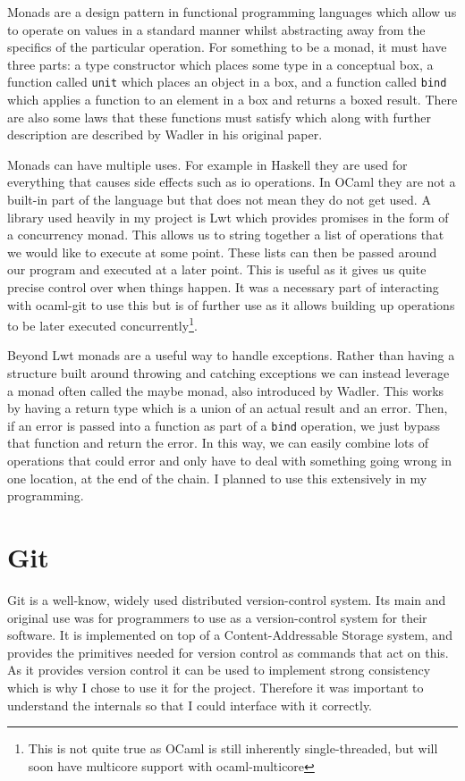 Monads are a design pattern in functional programming languages which allow us to operate on values in a standard manner whilst abstracting away from the specifics of the particular operation. For something to be a monad, it must have three parts: a type constructor which places some type in a conceptual box, a function called \texttt{unit} which places an object in a box, and a function called \texttt{bind} which applies a function to an element in a box and returns a boxed result. There are also some laws that these functions must satisfy which along with further description are described by Wadler in his original paper\cite{wadler90monads}.

Monads can have multiple uses. For example in Haskell they are used for everything that causes side effects such as io operations. In OCaml they are not a built-in part of the language but that does not mean they do not get used. A library used heavily in my project is Lwt\cite{code_lwt} which provides promises in the form of a concurrency monad. This allows us to string together a list of operations that we would like to execute at some point. These lists can then be passed around our program and executed at a later point. This is useful as it gives us quite precise control over when things happen. It was a necessary part of interacting with ocaml-git to use this but is of further use as it allows building up operations to be later executed concurrently\footnote{This is not quite true as OCaml is still inherently single-threaded, but will soon have multicore support with ocaml-multicore\cite{dolan2014multicore}}.

Beyond Lwt monads are a useful way to handle exceptions. Rather than having a structure built around throwing and catching exceptions we can instead leverage a monad often called the maybe monad, also introduced by Wadler\cite{wadler90monads}. This works by having a return type which is a union of an actual result and an error. Then, if an error is passed into a function as part of a \texttt{bind} operation, we just bypass that function and return the error. In this way, we can easily combine lots of operations that could error and only have to deal with something going wrong in one location, at the end of the chain. I planned to use this extensively in my programming.

\section{Git}

Git\cite{code_git} is a well-know, widely used distributed version-control system. Its main and original use was for programmers to use as a version-control system for their software\cite{TODO}. It is implemented on top of a Content-Addressable Storage system, and provides the primitives needed for version control as commands that act on this. As it provides version control it can be used to implement strong consistency which is why I chose to use it for the project. Therefore it was important to understand the internals so that I could interface with it correctly.

